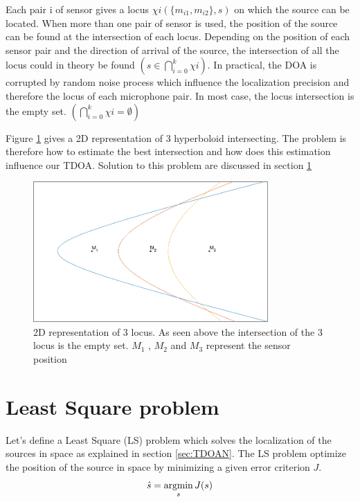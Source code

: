 \iffalse
Each pair i of sensor gives a locus $\chi{i}(\{m_{i1},m_{i2}\},s)$ on which the source can be located. When more than one pair of sensor is used, the position of the source can be found at the intersection of each locus. Depending on the position of each sensor pair and the direction of arrival of the source, the intersection of all the locus could in theory be found $ ( s\in {\bigcap}_{i=0}^k \chi{i} )$. In practical, the DOA is corrupted by random noise process which influence the localization precision and therefore the locus of each microphone pair. In most case, the locus intersection is the empty set. $ ( {\bigcap}_{i=0}^k \chi{i} = \emptyset ) $


Figure \ref{fig:hyperboloid_intersect} gives a 2D representation of 3 hyperboloid intersecting. The problem is therefore how to estimate the best intersection and how does this estimation influence our TDOA. Solution to this problem are discussed in section \ref{sec:LSTDOA}

\begin{figure}[H]
    \centering
    \includegraphics[width=0.8\textwidth]{Figures/intersect.png}
    \caption{2D representation of 3 locus. As seen above the intersection of the 3 locus is the empty set. $M_{1}$ , $M_{2}$ and $M_{3}$ represent the sensor position}
    \label{fig:hyperboloid_intersect}
\end{figure}

\section{Least Square problem}\label{sec:LSTDOA}

Let's define a Least Square (LS) problem which solves the localization of the sources in space as explained in section \ref{sec:TDOAN}. The LS problem optimize the position of the source in space by minimizing a given error criterion $ J $.
\begin{equation}
\hat{s}= \argmin_{s} J(s) 
\end{equation}

